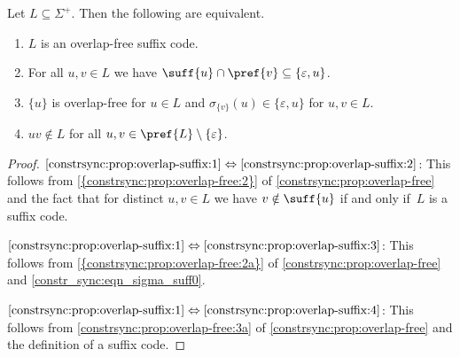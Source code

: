 \begin{proposition} \label{constrsync:prop:overlap-suffix}
Let $L \subseteq \Sigma^+$. Then the following are equivalent.
\begin{enumerate}
\item \label{constrsync:prop:overlap-suffix:1} $L$ is an overlap-free suffix code.

\item \label{constrsync:prop:overlap-suffix:2} For all $u,v \in L$ we have $\suff{u} \cap \pref{v} \subseteq \{\varepsilon, u\}$.

\item \label{constrsync:prop:overlap-suffix:3} $\{u\}$ is overlap-free for $u \in L$ and $\sigma_{\{v\}}(u) \in \{\varepsilon, u\}$ for $u,v \in L$.

\item \label{constrsync:prop:overlap-suffix:4} $uv \notin L$ for all $u,v \in \pref{L} \setminus \{\varepsilon\}$.	
\end{enumerate}
\end{proposition}
\begin{proof}
$\ref{constrsync:prop:overlap-suffix:1} \Leftrightarrow \ref{constrsync:prop:overlap-suffix:2}$: This follows from \cref{{constrsync:prop:overlap-free:2}} of \cref{constrsync:prop:overlap-free}
and the fact that for distinct $u,v \in L$ we have $v \notin \suff{u}$ if and only if~$L$ is a suffix code.

$\ref{constrsync:prop:overlap-suffix:1} \Leftrightarrow \ref{constrsync:prop:overlap-suffix:3}$:
This follows from \cref{{constrsync:prop:overlap-free:2a}} of \cref{constrsync:prop:overlap-free}
and \cref{constr_sync:eqn_sigma_suff0}.

$\ref{constrsync:prop:overlap-suffix:1} \Leftrightarrow \ref{constrsync:prop:overlap-suffix:4}$: This follows from \cref{constrsync:prop:overlap-free:3a} of
\cref{constrsync:prop:overlap-free}
and the definition of a suffix code.	
\end{proof}

